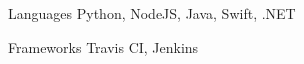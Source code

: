 
\begin{cvskills}
  \cvskill
    {Languages} %
    {Python, NodeJS, Java, Swift, .NET} %

  \cvskill
    {Frameworks} %
    {Travis CI, Jenkins} %
\end{cvskills}
